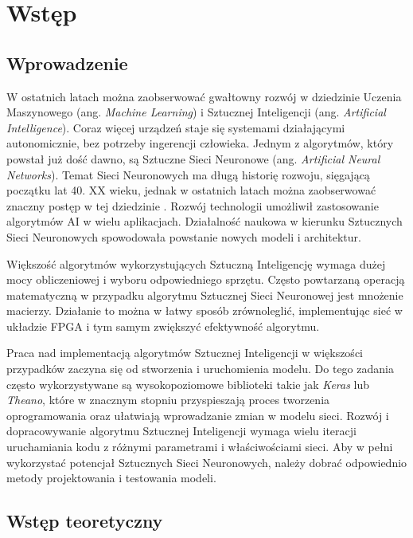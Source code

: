 \newpage %
\cleardoublepage %
\pagestyle{headings}
\section{Wstęp}

\subsection{Wprowadzenie}

W ostatnich latach można zaobserwować gwałtowny rozwój w dziedzinie 
Uczenia Maszynowego (ang. \emph{Machine Learning}) i Sztucznej Inteligencji 
(ang. \emph{Artificial Intelligence}). Coraz więcej urządzeń staje się systemami działającymi autonomicznie, bez potrzeby ingerencji człowieka. 
Jednym z algorytmów, który powstał już dość dawno, są Sztuczne Sieci Neuronowe (ang. \emph{Artificial Neural Networks}). Temat Sieci Neuronowych ma długą historię rozwoju, sięgającą początku lat 40. XX wieku, jednak w ostatnich latach można zaobserwować znaczny postęp w tej dziedzinie \cite{Kriesel2007NeuralNetworks}. Rozwój technologii umożliwił zastosowanie algorytmów AI w wielu aplikacjach. Działalność naukowa w kierunku Sztucznych Sieci Neuronowych spowodowała powstanie nowych modeli i architektur.

Większość algorytmów wykorzystujących Sztuczną Inteligencję wymaga dużej mocy 
obliczeniowej i wyboru odpowiedniego sprzętu. Często powtarzaną operacją matematyczną 
w przypadku algorytmu Sztucznej Sieci Neuronowej jest mnożenie macierzy.
Działanie to można w łatwy sposób zrównoleglić, implementując sieć w układzie 
FPGA i tym samym zwiększyć efektywność algorytmu.

Praca nad implementacją algorytmów Sztucznej Inteligencji w większości 
przypadków zaczyna się od stworzenia i uruchomienia modelu. Do tego zadania 
często wykorzystywane są wysokopoziomowe biblioteki takie jak \emph{Keras} lub \emph{Theano}, które w znacznym stopniu przyspieszają proces tworzenia oprogramowania oraz ułatwiają wprowadzanie zmian w modelu sieci. Rozwój i dopracowywanie 
algorytmu Sztucznej Inteligencji wymaga wielu iteracji uruchamiania kodu 
z różnymi parametrami i właściwościami sieci. Aby w pełni wykorzystać potencjał Sztucznych Sieci Neuronowych, należy dobrać odpowiednio metody projektowania i testowania modeli.

\subsection{Wstęp teoretyczny}

